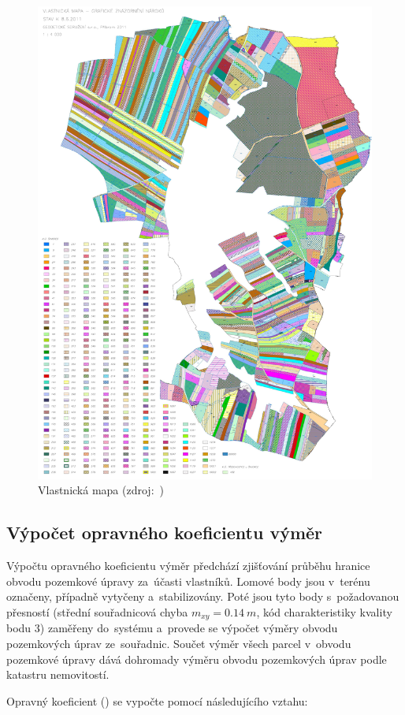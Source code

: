 	\begin{figure}[H] \centering
		\includegraphics[width=.8\textwidth]{./pictures/vlastnicka_mapa.pdf}
		\caption[Vlastnická mapa]{Vlastnická mapa
(zdroj:~\citep{skvorec})}
		\label{fig:vlastnicka_mapa}
 	\end{figure}

\subsection{Výpočet opravného koeficientu výměr}
\label{vypocet_ok}

Výpočtu opravného koeficientu výměr předchází zjišťování průběhu
hranice obvodu pozemkové úpravy za~účasti vlastníků. Lomové body jsou
v~terénu označeny, případně vytyčeny a~stabilizovány. Poté jsou tyto
body s~požadovanou přesností (střední souřadnicová chyba
$m_{xy}=0.14~m$, kód charakteristiky kvality bodu $3$) zaměřeny
do~systému  a~provede se výpočet výměry obvodu pozemkových
úprav ze~souřadnic. Součet výměr všech parcel v~obvodu pozemkové
úpravy dává dohromady výměru obvodu pozemkových úprav podle katastru
nemovitostí.

Opravný koeficient () se vypočte pomocí následujícího vztahu:

